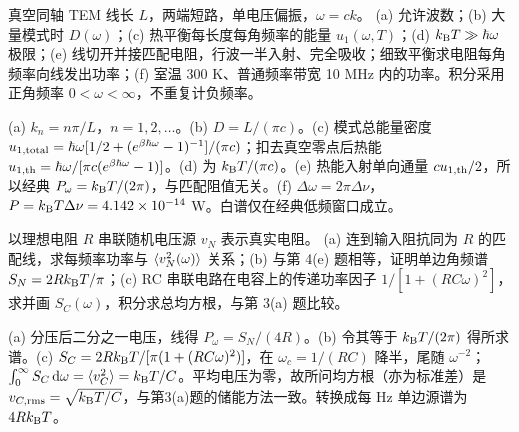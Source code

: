 \begin{exercise}
真空同轴 TEM 线长 $L$，两端短路，单电压偏振，$\omega=ck$。
(a) 允许波数；(b) 大量模式时 $D(\omega)$；(c) 热平衡每长度每角频率的能量 $u_1(\omega,T)$；(d) $k_{\mathrm B} T\gg\hbar\omega$ 极限；(e) 线切开并接匹配电阻，行波一半入射、完全吸收；细致平衡求电阻每角频率向线发出功率；(f) 室温 300 K、普通频率带宽 10 MHz 内的功率。积分采用正角频率 $0<\omega<\infty$，不重复计负频率。
\end{exercise}
\begin{solution}
(a) $k_n=n\pi/L$，$n=1,2,\ldots$。(b) $D=L/(\pi c)$。(c) 模式总能量密度 $u_{1,\rm total}=\hbar\omega[1/2+(e^{\beta\hbar\omega}-1)^{-1}]/(\pi c)$；扣去真空零点后热能 $u_{1,\rm th}=\hbar\omega/[\pi c(e^{\beta\hbar\omega}-1)]$。(d) 为 $k_{\mathrm B} T/(\pi c)$。(e) 热能入射单向通量 $cu_{1,\rm th}/2$，所以经典 $P_\omega=k_{\mathrm B} T/(2\pi)$，与匹配阻值无关。(f) $\Delta\omega=2\pi\Delta\nu$，$P=k_{\mathrm B} T\Delta\nu=4.142\times10^{-14}$ W。白谱仅在经典低频窗口成立。
\end{solution}
\begin{exercise}
以理想电阻 $R$ 串联随机电压源 $v_N$ 表示真实电阻。
(a) 连到输入阻抗同为 $R$ 的匹配线，求每频率功率与 $\langle v_N^2(\omega)\rangle$ 关系；(b) 与第 4(e) 题相等，证明单边角频谱 $S_N=2Rk_{\mathrm B} T/\pi$；(c) RC 串联电路在电容上的传递功率因子 $1/[1+(RC\omega)^2]$，求并画 $S_C(\omega)$，积分求总均方根，与第 3(a) 题比较。
\end{exercise}
\begin{solution}
(a) 分压后二分之一电压，线得 $P_\omega=S_N/(4R)$。(b) 令其等于 $k_{\mathrm B} T/(2\pi)$ 得所求谱。(c) $S_C=2Rk_{\mathrm B} T/[\pi(1+(RC\omega)^2)]$，在 $\omega_c=1/(RC)$ 降半，尾随 $\omega^{-2}$；$\int_0^\infty S_C\,\mathrm d\omega=\langle v_C^2\rangle=k_{\mathrm B} T/C$。平均电压为零，故所问均方根（亦为标准差）是 $v_{C,\rm rms}=\sqrt{k_{\mathrm B} T/C}$，与第3(a)题的储能方法一致。转换成每 Hz 单边源谱为 $4Rk_{\mathrm B} T$。
\end{solution}
\begin{center}\end{center}
